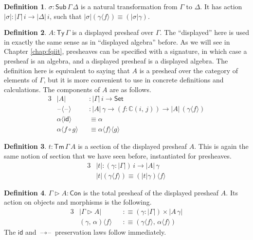 \documentclass[12pt,a4paper,twoside,openany]{book}
\theoremstyle{remark}
\theoremstyle{definition}
\newtheorem{mydefinition}{Definition}
\theoremstyle{theorem}
\newcommand{\mbb}[1]{\mathbb{#1}}
\newcommand{\id}{\mathsf{id}}
\newcommand{\Con}{\mathsf{Con}}
\newcommand{\Sub}{\mathsf{Sub}}
\newcommand{\Tm}{\mathsf{Tm}}
\newcommand{\Ty}{\mathsf{Ty}}
\newcommand{\blank}{\mathord{\hspace{1pt}\text{--}\hspace{1pt}}}
\newcommand{\Set}{\mathsf{Set}}
\newcommand{\ext}{\triangleright}
\newcommand{\mbbC}{\mbb{C}}
\newcommand{\lab}{\langle}
\newcommand{\rab}{\rangle}
\newcommand{\defn}{:\equiv}
\begin{document}
\begin{mydefinition}
$\sigma : \Sub\,\Gamma\,\Delta$ is a natural transformation from $\Gamma$ to
$\Delta$. It has action $|\sigma| : |\Gamma|\,i \to |\Delta|\,i$, such that
$|\sigma|(\gamma\lab f \rab) \equiv (|\sigma|\gamma)$.
\end{mydefinition}

\begin{mydefinition}
\label{def:presheaf-type}
$A : \Ty\,\Gamma$ is a displayed presheaf over $\Gamma$. The
``displayed'' here is used in exactly the same sense as in ``displayed
algebra'' before. As we will see in Chapter \ref{chap:fqiit}, presheaves can be
specified with a signature, in which case a presheaf is an algebra, and a
displayed presheaf is a displayed algebra. The definition here is equivalent
to saying that $A$ is a presheaf over the category of elements of $\Gamma$,
but it is more convenient to use in concrete definitions and calculations. The
components of $A$ are as follows.
\begin{alignat*}{3}
  &|A| &&: |\Gamma|\,i \to \Set\\
  &\blank\lab\blank\rab &&: |A|\,\gamma \to (f : \mbbC(i,\,j)) \to |A|\,(\gamma\lab f \rab)\\
  & \alpha\lab\id\rab &&\equiv \alpha \\
  & \alpha\lab f\circ g\rab &&\equiv \alpha \lab f \rab \lab g \rab
\end{alignat*}
\end{mydefinition}

\begin{mydefinition}
$t : \Tm\,\Gamma\,A$ is a section of the displayed presheaf $A$. This is
again the same notion of section that we have seen before, instantiated for
presheaves.
\begin{alignat*}{3}
  & |t| : (\gamma : |\Gamma|)\,i \to |A|\,\gamma \\
  & |t|(\gamma\lab f \rab) \equiv (|t|\gamma)\lab f \rab
\end{alignat*}
\end{mydefinition}

\begin{mydefinition}
$\Gamma \ext A : \Con$ is the total presheaf of the displayed presheaf $A$. Its action on objects and morphisms is the following.
\begin{alignat*}{3}
  &|\Gamma \ext A| &&\defn (\gamma : |\Gamma|) \times |A\,\gamma|\\
  &(\gamma,\,\alpha)\lab f \rab &&\defn (\gamma\lab f \rab,\, \alpha\lab f \rab)
\end{alignat*}
The $\id$ and $\blank\!\circ\!\blank$ preservation laws follow immediately.
\end{mydefinition}
\end{document}
